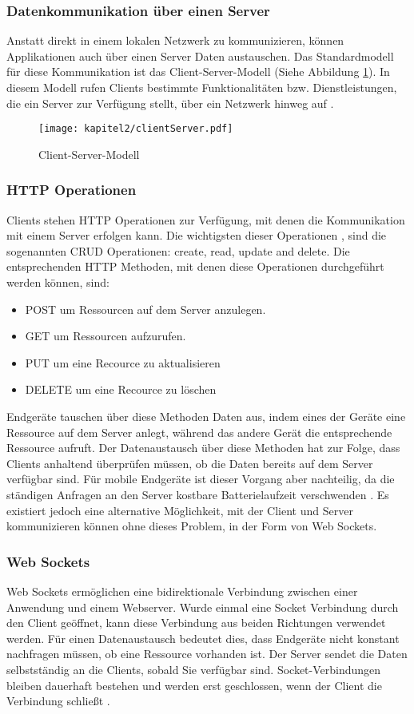 \subsubsection{Datenkommunikation über einen Server}
Anstatt direkt in einem lokalen Netzwerk zu kommunizieren, können Applikationen auch über einen Server Daten austauschen. Das Standardmodell für diese Kommunikation ist das Client-Server-Modell (Siehe Abbildung \ref{fig:clientServer}). In diesem Modell rufen Clients bestimmte Funktionalitäten bzw. Dienstleistungen, die ein Server zur Verfügung stellt, über ein Netzwerk hinweg auf \cite[14]{schill2012verteilte}.  
\begin{figure}[H]
  \centering
  \texttt{[image: kapitel2/clientServer.pdf]}
  \caption{Client-Server-Modell}
  \label{fig:clientServer}
\end{figure}
\subsubsection{HTTP Operationen}
Clients stehen \acs{HTTP} Operationen zur Verfügung, mit denen die Kommunikation mit einem Server erfolgen kann. Die wichtigsten dieser Operationen \cite[14]{rodriguez2008restful}, sind die sogenannten \acs{CRUD} Operationen: create, read, update and delete. Die entsprechenden \acs{HTTP} Methoden, mit denen diese Operationen durchgeführt werden können, sind:
\begin{itemize}
\item POST um Ressourcen auf dem Server anzulegen.
\item GET um Ressourcen aufzurufen.
\item PUT um eine Recource zu aktualisieren
\item DELETE um eine Recource zu löschen
\end{itemize}
Endgeräte tauschen über diese Methoden Daten aus, indem eines der Geräte eine Ressource auf dem Server anlegt, während das andere Gerät die entsprechende Ressource aufruft. Der Datenaustausch über diese Methoden hat zur Folge, dass Clients anhaltend überprüfen müssen, ob die Daten bereits auf dem Server verfügbar sind. Für mobile Endgeräte ist dieser Vorgang aber nachteilig, da die ständigen Anfragen an den Server kostbare Batterielaufzeit verschwenden \cite{lando2007efficient}. Es existiert jedoch eine alternative Möglichkeit, mit der Client und Server kommunizieren können ohne dieses Problem, in der Form von Web Sockets.

\subsubsection{Web Sockets}
Web Sockets ermöglichen eine bidirektionale Verbindung zwischen einer Anwendung und einem Webserver. Wurde einmal eine Socket Verbindung durch den Client geöffnet, kann diese Verbindung aus beiden Richtungen verwendet werden. Für einen Datenaustausch bedeutet dies, dass Endgeräte nicht konstant nachfragen müssen, ob eine Ressource vorhanden ist. Der Server sendet die Daten selbstständig an die Clients, sobald Sie verfügbar sind. Socket-Verbindungen bleiben dauerhaft bestehen und werden erst geschlossen, wenn der Client die Verbindung schließt \cite{lubbers2010html5}.



